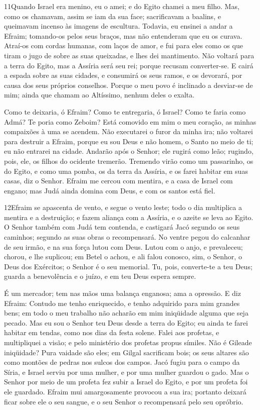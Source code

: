 \medskip

\lettrine{11} Quando Israel era menino, eu o amei; e do Egito
chamei a meu filho. Mas, como os chamavam, assim se iam da sua
face; sacrificavam a baalins, e queimavam incenso às imagens de
escultura. Todavia, eu ensinei a andar a Efraim; tomando-os
pelos seus braços, mas não entenderam que eu os curava. Atraí-os
com cordas humanas, com laços de amor, e fui para eles como os que
tiram o jugo de sobre as suas queixadas, e lhes dei mantimento.
Não voltará para a terra do Egito, mas a Assíria será seu rei;
porque recusam converter-se. E cairá a espada sobre as suas
cidades, e consumirá os seus ramos, e os devorará, por causa dos
seus próprios conselhos. Porque o meu povo é inclinado a
desviar-se de mim; ainda que chamam ao Altíssimo, nenhum deles o
exalta.

Como te deixaria, ó Efraim? Como te entregaria, ó Israel? Como te
faria como Admá? Te poria como Zeboim? Está comovido em mim o meu
coração, as minhas compaixões à uma se acendem. Não executarei o
furor da minha ira; não voltarei para destruir a Efraim, porque eu
sou Deus e não homem, o Santo no meio de ti; eu não entrarei na
cidade. Andarão após o Senhor; ele rugirá como leão; rugindo,
pois, ele, os filhos do ocidente tremerão. Tremendo virão
como um passarinho, os do Egito, e como uma pomba, os da terra da
Assíria, e os farei habitar em suas casas, diz o Senhor.
Efraim me cercou com mentira, e a casa de Israel com engano;
mas Judá ainda domina com Deus, e com os santos está fiel.

\medskip

\lettrine{12} Efraim se apascenta de vento, e segue o vento
leste; todo o dia multiplica a mentira e a destruição; e fazem
aliança com a Assíria, e o azeite se leva ao Egito. O Senhor
também com Judá tem contenda, e castigará Jacó segundo os seus
caminhos; segundo as suas obras o recompensará. No ventre pegou
do calcanhar de seu irmão, e na sua força lutou com Deus. Lutou
com o anjo, e prevaleceu; chorou, e lhe suplicou; em Betel o achou,
e ali falou conosco, sim, o Senhor, o Deus dos Exércitos; o
Senhor é o seu memorial. Tu, pois, converte-te a teu Deus;
guarda a benevolência e o juízo, e em teu Deus espera sempre.

É um mercador; tem nas mãos uma balança enganosa; ama a opressão.
E diz Efraim: Contudo me tenho enriquecido, e tenho adquirido
para mim grandes bens; em todo o meu trabalho não acharão em mim
iniqüidade alguma que seja pecado. Mas eu sou o Senhor teu Deus
desde a terra do Egito; eu ainda te farei habitar em tendas, como
nos dias da festa solene. Falei aos profetas, e multipliquei
a visão; e pelo ministério dos profetas propus símiles. Não é
Gileade iniqüidade? Pura vaidade são eles; em Gilgal sacrificam
bois; os seus altares são como montões de pedras nos sulcos dos
campos. Jacó fugiu para o campo da Síria, e Israel serviu por
uma mulher, e por uma mulher guardou o gado. Mas o Senhor por
meio de um profeta fez subir a Israel do Egito, e por um profeta foi
ele guardado. Efraim mui amargosamente provocou a sua ira;
portanto deixará ficar sobre ele o seu sangue, e o seu Senhor o
recompensará pelo seu opróbrio.

